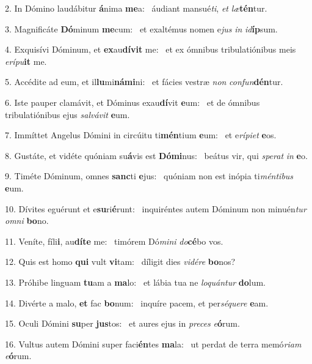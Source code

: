 2. In Dómino laudábitur \textbf{á}nima \textbf{me}a: \ast\  áudiant mansué\textit{ti}, \textit{et} \textit{læ}\textbf{tén}tur.\

3. Magnificáte \textbf{Dó}minum \textbf{me}cum: \ast\  et exaltémus nomen e\textit{jus} \textit{in} \textit{id}\textbf{íp}sum.\

4. Exquisívi Dóminum, et \textbf{ex}au\textbf{dí}\textbf{vit} me: \ast\  et ex ómnibus tribulatiónibus meis \textit{e}\textit{rí}\textit{pu}\textbf{it} me.\

5. Accédite ad eum, et il\textbf{lu}mi\textbf{ná}\textbf{mi}ni: \ast\  et fácies vestræ \textit{non} \textit{con}\textit{fun}\textbf{dén}tur.\

6. Iste pauper clamávit, et Dóminus exau\textbf{dí}vit \textbf{e}um: \ast\  et de ómnibus tribulatiónibus ejus \textit{sal}\textit{vá}\textit{vit} \textbf{e}um.\

7. Immíttet Angelus Dómini in circúitu ti\textbf{mén}tium \textbf{e}um: \ast\  et e\textit{rí}\textit{pi}\textit{et} \textbf{e}os.\

8. Gustáte, et vidéte quóniam su\textbf{á}vis est \textbf{Dó}\textbf{mi}nus: \ast\  beátus vir, qui \textit{spe}\textit{rat} \textit{in} \textbf{e}o.\

9. Timéte Dóminum, omnes \textbf{sanc}ti \textbf{e}jus: \ast\  quóniam non est inópia ti\textit{mén}\textit{ti}\textit{bus} \textbf{e}um.\

10. Dívites eguérunt et e\textbf{su}ri\textbf{é}runt: \ast\  inquiréntes autem Dóminum non minuén\textit{tur} \textit{om}\textit{ni} \textbf{bo}no.\

11. Veníte, fíli\textbf{i}, au\textbf{dí}\textbf{te} me: \ast\  timórem Dó\textit{mi}\textit{ni} \textit{do}\textbf{cé}bo vos.\

12. Quis est homo \textbf{qui} vult \textbf{vi}tam: \ast\  díligit dies \textit{vi}\textit{dé}\textit{re} \textbf{bo}nos?\

13. Próhibe linguam \textbf{tu}am a \textbf{ma}lo: \ast\  et lábia tua ne \textit{lo}\textit{quán}\textit{tur} \textbf{do}lum.\

14. Divérte a malo, \textbf{et} fac \textbf{bo}num: \ast\  inquíre pacem, et per\textit{sé}\textit{que}\textit{re} \textbf{e}am.\

15. Oculi Dómini \textbf{su}per \textbf{jus}tos: \ast\  et aures ejus in \textit{pre}\textit{ces} \textit{e}\textbf{ó}rum.\

16. Vultus autem Dómini super faci\textbf{én}tes \textbf{ma}la: \ast\  ut perdat de terra memó\textit{ri}\textit{am} \textit{e}\textbf{ó}rum.\

